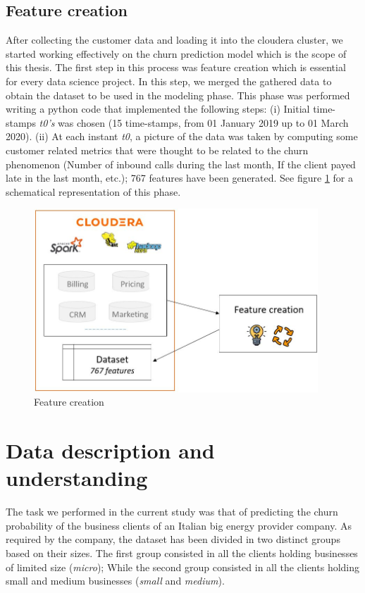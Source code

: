 \documentclass[LaM,binding=0.6cm, english]{sapthesis}
\begin{document}
\subsection{Feature creation} \label{feature-creation}

After collecting the customer data and loading it into the cloudera cluster, we started working effectively on the churn prediction model which is the scope of this thesis. The first step in this process was feature creation which is essential for every data science project. In this step, we merged the gathered data to obtain the dataset to be used in the modeling phase. This phase was performed writing a python code that implemented the following steps: (i) Initial time-stamps \textit{t0's} was chosen (15 time-stamps, from 01 January 2019 up to 01 March 2020). (ii) At each instant \textit{t0}, a picture of the data was taken by computing some customer related metrics that were thought to be related to the churn phenomenon (Number of inbound calls during the last month, If the client payed late in the last month, etc.); 767 features have been generated. See figure \ref{fig:feature-creation} for a schematical representation of this phase.

\begin{figure}[!ht]
    \includegraphics[width=0.95\textwidth]{images/feature_creation.jpg}
    \centering
    \caption{Feature creation}
    \label{fig:feature-creation}
\end{figure}

\section{Data description and understanding}

The task we performed in the current study was that of predicting the churn probability of the business clients of an Italian big energy provider company. As required by the company, the dataset has been divided in two distinct groups based on their sizes. The first group consisted in all the clients holding businesses of limited size (\textit{micro}); While the second group consisted in all the clients holding small and medium businesses (\textit{small} and \textit{medium}).
\end{document}
